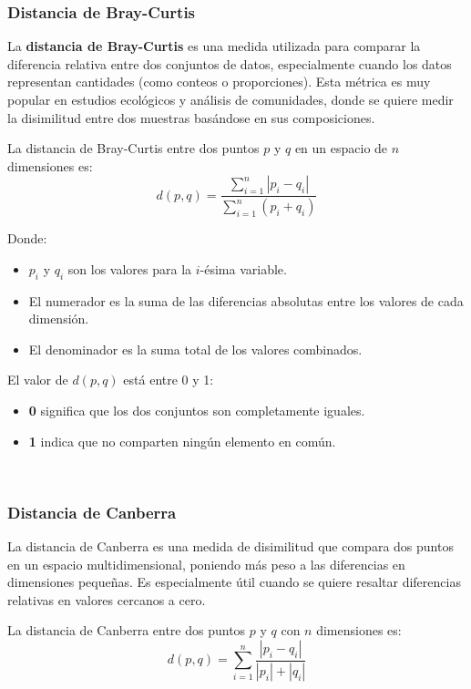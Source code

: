 \documentclass[12pt]{article}
\begin{document}
\subsubsection{Distancia de Bray-Curtis}
La \textbf{distancia de Bray-Curtis} es una medida utilizada para comparar la diferencia relativa entre dos conjuntos de datos, especialmente cuando los datos
representan cantidades (como conteos o proporciones). Esta métrica es muy popular en estudios ecológicos y análisis de comunidades, donde se quiere medir la disimilitud entre dos muestras basándose en sus composiciones.

La distancia de Bray-Curtis entre dos puntos $p$ y $q$ en un espacio de $n$ dimensiones es:
\begin{equation}
        d(p,q) =\frac{\sum_{i=1}^{n} | p_i - q_i|}{\sum_{i=1}^{n} (p_i + q_i)}
\end{equation}

Donde:
\begin{itemize}
    \item $p_i$ y $q_i$ son los valores para la $i$-ésima variable.
    \item El numerador es la suma de las diferencias absolutas entre los valores de cada dimensión.
    \item El denominador es la suma total de los valores combinados.
\end{itemize}

El valor de $d(p,q)$ está entre 0 y 1:
\begin{itemize}
    \item \textbf{0} significa que los dos conjuntos son completamente iguales.
    \item \textbf{1} indica que no comparten ningún elemento en común.
\end{itemize}
~\cite{De0a100enIA}

\subsubsection{Distancia de Canberra} 
La distancia de Canberra es una medida de disimilitud que compara dos puntos en un espacio multidimensional, poniendo más peso a las diferencias en dimensiones pequeñas.
Es especialmente útil cuando se quiere resaltar diferencias relativas en valores cercanos a cero.

La distancia de Canberra entre dos puntos $p$ y $q$ con $n$ dimensiones es:
\begin{equation}
    d(p,q) = \sum_{i=1}^{n} \frac{|p_i - q_i|}{|p_i| + |q_i|}
\end{equation} 
\end{document}
